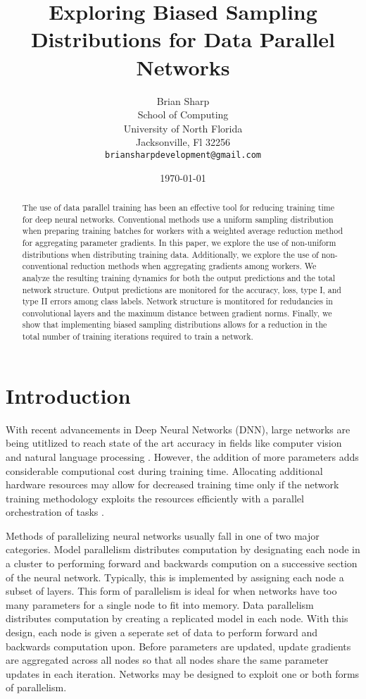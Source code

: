 \documentclass{article}
\title{Exploring Biased Sampling Distributions for Data Parallel Networks}
\author{
    Brian Sharp \\
    School of Computing \\
    University of North Florida \\
    Jacksonville, Fl 32256 \\
    \texttt{briansharpdevelopment@gmail.com}
}
\date{\today}
\begin{document}
\maketitle
\begin{abstract}
The use of data parallel training has been an effective tool for reducing training time for deep neural networks. Conventional methods use a uniform sampling distribution when preparing training batches for workers with a weighted average reduction method for aggregating parameter gradients. In this paper, we explore the use of non-uniform distributions when distributing training data. Additionally, we explore the use of non-conventional reduction methods when aggregating gradients among workers. We analyze the resulting training dynamics for both the output predictions and the total network structure. Output predictions are monitored for the accuracy, loss, type I, and type II errors among class labels. Network structure is montitored for redudancies in convolutional layers and the maximum distance between gradient norms. Finally, we show that implementing biased sampling distributions allows for a reduction in the total number of training iterations required to train a network.
\end{abstract}

\section{Introduction}

With recent advancements in Deep Neural Networks (DNN), large networks are being utitlized to reach state of the art accuracy in fields like computer vision and natural language processing \cite{bert, deep_res, very_deep_conv}. However, the addition of more parameters adds considerable computional cost during training time. Allocating additional hardware resources may allow for decreased training time only if the network training methodology exploits the resources efficiently with a parallel orchestration of tasks \cite{shallue_dahl_2019}. 

Methods of parallelizing neural networks usually fall in one of two major categories. Model parallelism distributes computation by designating each node in a cluster to performing forward and backwards compution on a successive section of the neural network. Typically, this is implemented by assigning each node a subset of layers. This form of parallelism is ideal for when networks have too many parameters for a single node to fit into memory. Data parallelism distributes computation by creating a replicated model in each node. With this design, each node is given a seperate set of data to perform forward and backwards computation upon. Before parameters are updated, update gradients are aggregated across all nodes so that all nodes share the same parameter updates in each iteration. Networks may be designed to exploit one or both forms of parallelism. 
\end{document}
